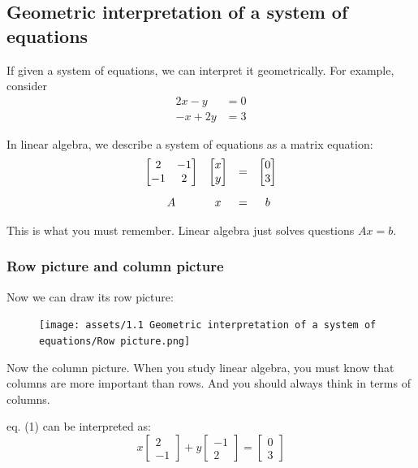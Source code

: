 \documentclass[12pt]{ctexart}
\begin{document}
\fontsize{12}{14}
\newpage
\subsection{\textbf{Geometric interpretation of a system of equations}}
If given a system of equations, we can interpret it geometrically. For example, consider
\begin{equation}
    \begin{aligned}
        2x - y &= 0 \\
        -x + 2y &= 3
    \end{aligned}
\end{equation}

In linear algebra, we describe a system of equations as a matrix equation:
\[
  \arraycolsep=0.5em
  \begin{array}{c c c c}
    \begin{bmatrix} 2 & -1 \\ -1 & 2 \end{bmatrix}
    &
    \begin{bmatrix} x \\ y \end{bmatrix}
    &
    =
    &
    \begin{bmatrix} 0 \\ 3 \end{bmatrix}
    \\[1.5em]
    A & x & = & b
  \end{array}
\]

This is what you must remember. Linear algebra just solves questions $Ax = b$.

\subsubsection{\textbf{Row picture and column picture}}
Now we can draw its row picture:
\begin{figure}[H]
    \centering
    \texttt{[image: assets/1.1 Geometric interpretation of
    a system of equations/Row picture.png]}
\end{figure}

Now the column picture. When you study linear algebra, you must know that columns are
more important than rows. And you should always think in terms of columns.

eq. (1) can be interpreted as:
\[
  x \begin{bmatrix} 2 \\ -1 \end{bmatrix} +
  y \begin{bmatrix} -1 \\ 2 \end{bmatrix} =
  \begin{bmatrix} 0 \\ 3 \end{bmatrix}
\]
\end{document}
